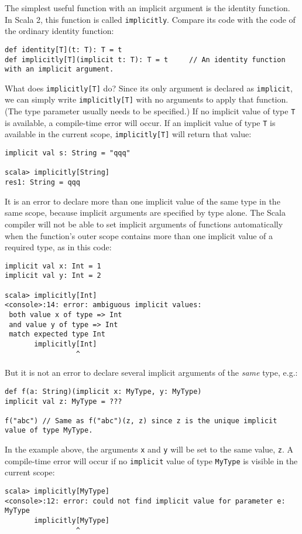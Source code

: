 The simplest useful function with an implicit argument is the identity
function. In Scala 2, this function is called \lstinline!implicitly!.
Compare its code with the code of the ordinary identity function:
\begin{lstlisting}
def identity[T](t: T): T = t
def implicitly[T](implicit t: T): T = t     // An identity function with an implicit argument.
\end{lstlisting}
What does \lstinline!implicitly[T]! do? Since its only argument is
declared as \lstinline!implicit!, we can simply write \lstinline!implicitly[T]!
with no arguments to apply that function. (The type parameter usually
needs to be specified.) If no implicit value of type \lstinline!T!
is available, a compile-time error will occur. If an implicit value
of type \lstinline!T! is available in the current scope, \lstinline!implicitly[T]!
will return that value:
\begin{lstlisting}
implicit val s: String = "qqq"

scala> implicitly[String]
res1: String = qqq
\end{lstlisting}

It is an error to declare more than one implicit value of the same
type in the same scope, because implicit arguments are specified by
type alone. The Scala compiler will not be able to set implicit arguments
of functions automatically when the function\textsf{'}s outer scope contains
more than one implicit value of a required type, as in this code:
\begin{lstlisting}
implicit val x: Int = 1
implicit val y: Int = 2

scala> implicitly[Int]
<console>:14: error: ambiguous implicit values:
 both value x of type => Int
 and value y of type => Int
 match expected type Int
       implicitly[Int]
                 ^
\end{lstlisting}
But it is not an error to declare several implicit arguments of the
\emph{same} type, e.g.:
\begin{lstlisting}
def f(a: String)(implicit x: MyType, y: MyType)
implicit val z: MyType = ???

f("abc") // Same as f("abc")(z, z) since z is the unique implicit value of type MyType.
\end{lstlisting}
In the example above, the arguments \lstinline!x! and \lstinline!y!
will be set to the same value, \lstinline!z!. A compile-time error
will occur if no \lstinline!implicit! value of type \lstinline!MyType!
is visible in the current scope:
\begin{lstlisting}
scala> implicitly[MyType]
<console>:12: error: could not find implicit value for parameter e: MyType
       implicitly[MyType]
                 ^
\end{lstlisting}


